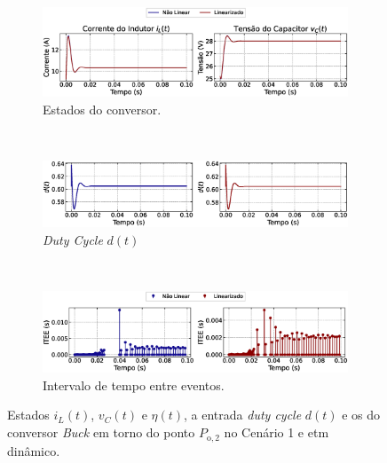 \begin{figure}[H]
  \centering
  \captionsetup{justification=centering}
  \begin{subfigure}{1.\textwidth}
    \centering
    \includegraphics[width=1.\textwidth]{figuras/dynamic-etm/buck/sim1/op2/result.eps}
    \caption{Estados do conversor.}
    \label{fig:buck_converter_constant_pcpl_dynamic_etm_op2_a}
  \end{subfigure}
  \\[6pt]
  \begin{subfigure}{1.\textwidth}
    \centering
    \includegraphics[width=1.\textwidth]{figuras/dynamic-etm/buck/sim1/op2/duty-cycle.eps}
    \caption{\textit{Duty Cycle} $d(t)$}
    \label{fig:buck_converter_constant_pcpl_dynamic_etm_op2_b}
  \end{subfigure}
  \\[6pt]
  \begin{subfigure}{1.\textwidth}
    \centering
    \includegraphics[width=1.\textwidth]{figuras/dynamic-etm/buck/sim1/op2/inter-event-times.eps}
    \caption{Intervalo de tempo entre eventos.}
    \label{fig:buck_converter_constant_pcpl_dynamic_etm_op2_c}
  \end{subfigure}
  \caption{Estados $i_L(t)$, $v_C(t)$ e $\eta(t)$, a entrada \textit{duty cycle} $d(t)$ e os  do conversor \textit{Buck} em torno do ponto $P_{\mathrm{o}, 2}$ no Cenário 1 e \acrshort{etm} dinâmico.}
  \label{fig:buck_converter_constant_pcpl_dynamic_etm_op2}
\end{figure}

